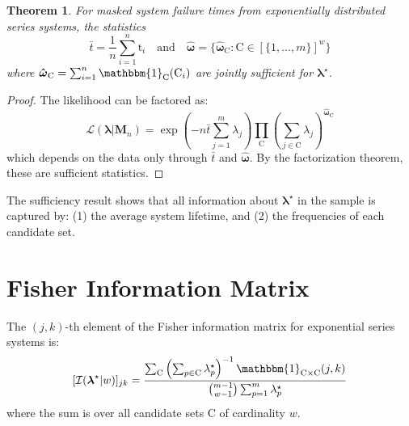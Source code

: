 \documentclass[12pt]{article}
\newcommand{\RV}[1]{\mathrm{#1}}
\newcommand{\cand}{\RV{C}}         %
\newcommand{\ti}{\mathrm{t}}       %
\newcommand{\tparam}[1]{{#1}^{\star}}  %
\newcommand{\infomatrx}{\mathcal{I}}
\newcommand{\likelihood}{\mathcal{L}}
\newcommand{\mfs}{\mathbf{M}_n}
\newcommand{\cntsymb}{\boldsymbol{\hat\omega}}
\renewcommand{\vec}[1]{\boldsymbol{#1}}
\newtheorem{theorem}{Theorem}[section]
\theoremstyle{definition}
\begin{document}
\begin{theorem}
\label{thm:sufficient_stats}
For masked system failure times from exponentially distributed series systems, the statistics
\begin{equation}
\bar{t} = \frac{1}{n} \sum_{i=1}^{n} \ti_i \quad \text{and} \quad \cntsymb = \{\cntsymb_{\cand} : \cand \in [\{1, \ldots, m\}]^w\}
\end{equation}
where $\cntsymb_{\cand} = \sum_{i=1}^{n} \mathbbm{1}_{\cand}(\cand_i)$ are jointly sufficient for $\tparam{\vec{\lambda}}$.
\end{theorem}

\begin{proof}
The likelihood can be factored as:
\begin{equation}
\likelihood(\vec{\lambda} | \mfs) = \exp\left(-n \bar{t} \sum_{j=1}^{m} \lambda_j\right) \prod_{\cand} \left(\sum_{j \in \cand} \lambda_j\right)^{\cntsymb_{\cand}}
\end{equation}
which depends on the data only through $\bar{t}$ and $\cntsymb$. By the factorization theorem, these are sufficient statistics.
\end{proof}

The sufficiency result shows that all information about $\tparam{\vec{\lambda}}$ in the sample is captured by: (1) the average system lifetime, and (2) the frequencies of each candidate set.

\section{Fisher Information Matrix}

The $(j,k)$-th element of the Fisher information matrix for exponential series systems is:
\begin{equation}
\label{eq:expo_fisher_element}
[\infomatrx(\tparam{\vec{\lambda}} | w)]_{jk} = \frac{\sum_{\cand} \left(\sum_{p \in \cand} \tparam{\lambda}_p\right)^{-1} \mathbbm{1}_{\cand \times \cand}(j,k)}{\binom{m-1}{w-1} \sum_{p=1}^{m} \tparam{\lambda}_p}
\end{equation}
where the sum is over all candidate sets $\cand$ of cardinality $w$.
\end{document}
